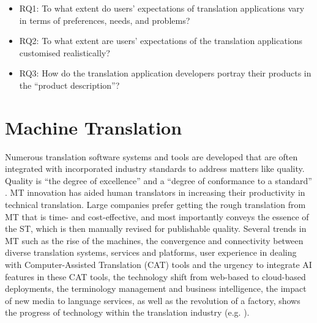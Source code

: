 \documentclass[english]{textolivre}
\begin{document}
\begin{itemize}
    \item RQ1: To what extent do users’ expectations of translation applications vary in terms of preferences, needs, and problems?
    \item RQ2: To what extent are users’ expectations of the translation applications customised realistically?
    \item RQ3: How do the translation application developers portray their products in the “product description”?
\end{itemize}

\section{Machine Translation}\label{sec-normas}
Numerous translation software systems and tools are developed that are often integrated with incorporated industry standards to address matters like quality. Quality is “the degree of excellence” and a “degree of conformance to a standard” \cite{amini_quality_2013}. MT innovation has aided human translators in increasing their productivity in technical translation. Large companies prefer getting the rough translation from MT that is time- and cost-effective, and most importantly conveys the essence of the ST, which is then manually revised for publishable quality. Several trends in MT such as the rise of the machines, the convergence and connectivity between diverse translation systems, services and platforms, user experience in dealing with Computer-Assisted Translation (CAT) tools and the urgency to integrate AI features in these CAT tools, the technology shift from web-based to cloud-based deployments, the terminology management and business intelligence, the impact of new media to language services, as well as the revolution of a factory, shows the progress of technology within the translation industry (e.g. \textcite{gunarto_apps-based_2019}).
\end{document}
